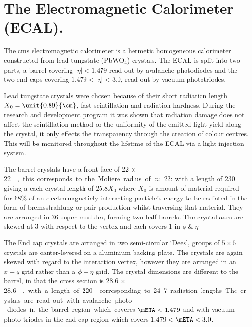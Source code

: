 
\section{The Electromagnetic Calorimeter (ECAL).} %
\label{sec:the_electromagnetic_calorimeter}
The \ac{cms} electromagnetic calorimeter is a hermetic homogeneous calorimeter 
constructed from lead tungstate (PbWO$_{4}$) crystals. The ECAL is split into 
two parts, a barrel covering $|\eta| < 1.479$ read out by avalanche photodiodes 
and the two end-caps covering $1.479 < |\eta| < 3.0$, read out by vacuum 
phototriodes.

Lead tungstate crystals were chosen because of their short radiation length 
$X_{0}= \unit{0.89}{\cm}$, fast scintillation and radiation hardness. During 
the research and development program it was shown that radiation damage does 
not affect the scintillation method or the uniformity of the emitted light 
yield along the crystal, it only effects the transparency through the creation 
of colour centres. This will be monitored throughout the lifetime of the ECAL 
via a light injection system\cite{Smith:2000p5245}.

The barrel crystals have a front face of \unit{22 $\times$ 22}{\mm\squared}, 
this corresponds to the Moliere radius of $\approx $ \unit{22}{\mm}; with a 
length of \unit{230}{\mm} giving a each crystal length of $25.8 X_{0}$ where 
$X_{0}$ is amount of material required for 68$\%$ of an electromagneticly 
interacting particle's energy to be radiated in the form of bremsstrahlung or 
pair production whilst traversing that material. They are arranged in 36 
super-modules, forming two half barrels. The crystal axes are skewed at 
\unit{3}{\degree} with respect to the vertex and each covers \unit{1}{\degree} 
in $\phi ~ \& ~ \eta$

The End cap crystals are arranged in two semi-circular `Dees', groups of 
$5\times 5$ crystals are canter-levered on a aluminium backing plate. The 
crystals are again skewed with regard to the interaction vertex, however they 
are arranged in an $x-y$ grid rather than a $\phi - \eta$ grid. The crystal 
dimensions are different to the barrel, in that the cross section is \unit{28.6 
$\times$ 28.6}{\mm\squared}, with a length of \unit{220}{\mm} corresponding to 
24.7 radiation lengths

The crystals are read out with avalanche photo-diodes in the barrel region which coveres $\mETA < 1.479$ and with vacuum photo-triodes in the end cap region which covers $1.479 < \mETA < 3.0$.

